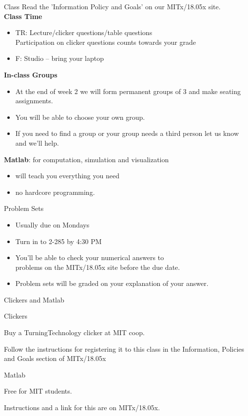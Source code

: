 \begin{frame}{Class}
Read the 'Information Policy and Goals' on our MITx/18.05x site.\\[2ex]

\textbf{Class Time}
\begin{itemize}
\item TR: Lecture/clicker questions/table questions\\
Participation on clicker questions counts towards your grade
\item F: Studio -- bring your laptop
\end{itemize}

\bigskip

\textbf{In-class Groups}
\begin{itemize}
\item At the end of week 2 we will form permanent groups of 3 and make seating assignments.
\item You will be able to choose your own group.
\item If you need to find a group or your group needs a third person let us know and we'll help.
\end{itemize}

\bigskip
\textbf{Matlab}: for computation, simulation and visualization
\begin{itemize}
\item will teach you everything you need 
\item no hardcore programming.
\end{itemize}
\end{frame}


\begin{frame}{Problem Sets}

{\Large
\begin{itemize}
\item Usually due on Mondays
\item Turn in to 2-285 by 4:30 PM\\ 
\item You'll be able to check your numerical answers to \\
problems on the MITx/18.05x site before the due date.
\item Problem sets will be graded on your explanation of 
your answer.
\end{itemize}
}
\end{frame}

\begin{frame}{Clickers and Matlab}

{\LARGE Clickers}

{\Large
Buy a TurningTechnology clicker at MIT coop.

Follow the instructions for registering it to this class in
the Information, Policies and Goals section of MITx/18.05x\\

\bigskip
\bigskip
     
{\LARGE Matlab}

Free for MIT students. 

Instructions and a link for this are on MITx/18.05x.
}

\end{frame}

